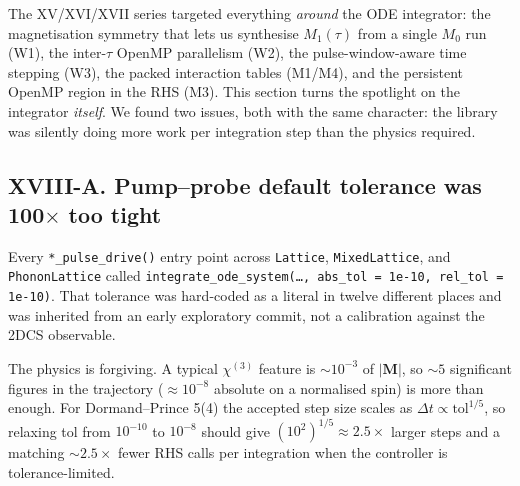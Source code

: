 \documentclass[11pt,letterpaper]{article}
\begin{document}
The XV/XVI/XVII series targeted everything \emph{around} the ODE
integrator: the magnetisation symmetry that lets us synthesise
$M_1(\tau)$ from a single $M_0$ run (W1), the inter-$\tau$ OpenMP
parallelism (W2), the pulse-window-aware time stepping (W3), the
packed interaction tables (M1/M4), and the persistent OpenMP region
in the RHS (M3).  This section turns the spotlight on the integrator
\emph{itself}.  We found two issues, both with the same character:
the library was silently doing more work per integration step than
the physics required.

\subsection*{XVIII-A.  Pump--probe default tolerance was 100$\times$
too tight}

Every \texttt{*\_pulse\_drive()} entry point across
\texttt{Lattice}, \texttt{MixedLattice}, and \texttt{PhononLattice}
called \texttt{integrate\_ode\_system(\dots, abs\_tol = 1e-10,
rel\_tol = 1e-10)}.  That tolerance was hard-coded as a literal in
twelve different places and was inherited from an early
exploratory commit, not a calibration against the 2DCS observable.

The physics is forgiving.  A typical $\chi^{(3)}$ feature is
$\sim 10^{-3}$ of $|\mathbf{M}|$, so $\sim 5$ significant figures
in the trajectory ($\approx 10^{-8}$ absolute on a normalised
spin) is more than enough.  For Dormand--Prince 5(4) the accepted
step size scales as $\Delta t \propto \text{tol}^{1/5}$, so
relaxing tol from $10^{-10}$ to $10^{-8}$ should give
$(10^{2})^{1/5} \approx 2.5\times$ larger steps and a matching
$\sim 2.5\times$ fewer RHS calls per integration when the
controller is tolerance-limited.
\end{document}
